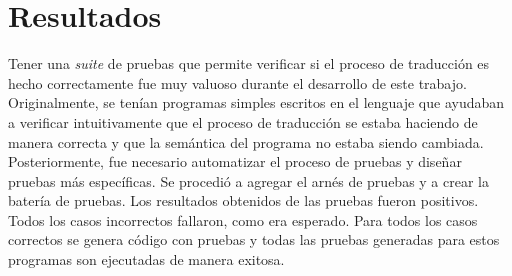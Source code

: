 \begin{comment}
\begin{figure}
\begin{lstlisting}
#!/bin/bash

TEST_NAMES=(bubblesort_test count_test fact_test fib_test
  mergesort_test min_test occurs_test quicksort_test selection_test
  strlen_test plus_test subst_test outer_scope_test local_scope_test
  global_scope_test global_scope2_test mod_test div_test mult_test
  less_test and_test or_test not_test eq_test new_test deref_test
  while_test returnv_test linked_list_test cyclic_linked_list_test)

for test_name in ${TEST_NAMES[@]}
do
  res=$(./${test_name});
  ret=$?

if [[ ${res} == Failed* ]];
  then
    echo -e "\e[31mFAILED: \e[39m${res}"
else
  case ${ret} in

  1) echo -e "\e[31mError\e[39m (general error)
    occurred in the execution of ${test_name}";;
  2) echo -e "\e[31mError\e[39m (misuse of shell builtins)
    occurred in the execution of ${test_name}";;
  3) echo -e "\e[31mMemory allocation error\e[39m ocurred
    in execution of ${test_name}";;
  126) echo -e "\e[31mError\e[39m (command invoked cannot execute)
    occurred in the execution of ${test_name}";;
  127) echo -e "\e[31mError\e[39m (command not found)
    occurred in the execution of ${test_name}";;
  128) echo -e "\e[31mError\e[39m (invalid argument given to exit)
    occurred in the execution of ${test_name}";;
  130) echo -e "\e[31mError\e[39m (program terminated by Ctrl+C)
    occurred in the execution of ${test_name}";;
  139) echo -e "\e[31mSegmentation fault\e[39m ocurred
    in execution of ${test_name}";;
  *) echo ${res};;
  esac
fi
done
\end{lstlisting}

\caption{\textit{Shell script} para la ejecución de pruebas}
\label{fig:bash_script}
\end{figure}
\end{comment}

\section{Resultados}\label{section:results}

Tener una \textit{suite} de pruebas que permite verificar si el proceso de traducción es hecho correctamente fue muy valuoso durante el desarrollo de este trabajo.
Originalmente, se tenían programas simples escritos en el lenguaje que ayudaban a verificar intuitivamente que el proceso de traducción se estaba haciendo de manera correcta y que la semántica del programa no estaba siendo cambiada.
Posteriormente, fue necesario automatizar el proceso de pruebas y diseñar pruebas más específicas.
Se procedió a agregar el arnés de pruebas y a crear la batería de pruebas.
Los resultados obtenidos de las pruebas fueron positivos.
Todos los casos incorrectos fallaron, como era esperado.
Para todos los casos correctos se genera código con pruebas y todas las pruebas generadas para estos programas son ejecutadas de manera exitosa.

